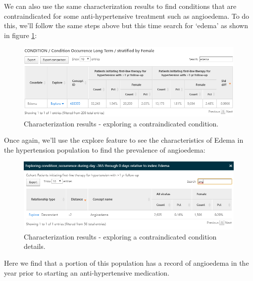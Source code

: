 \documentclass[11pt]{book}
\theoremstyle{definition}
\theoremstyle{definition}
\theoremstyle{definition}
\theoremstyle{remark}
\begin{document}
We can also use the same characterization results to find conditions that are contraindicated for some anti-hypertensive treatment such as angioedema. To do this, we'll follow the same steps above but this time search for `edema' as shown in figure \ref{fig:atlasCharacterizationResultsContra}:

\begin{figure}

{\centering \includegraphics[width=1\linewidth]{images/Characterization/atlasCharacterizationResultsContra} 

}

\caption{Characterization results - exploring a contraindicated condition.}\label{fig:atlasCharacterizationResultsContra}
\end{figure}

Once again, we'll use the explore feature to see the characteristics of Edema in the hypertension population to find the prevalence of angioedema:

\begin{figure}

{\centering \includegraphics[width=1\linewidth]{images/Characterization/atlasCharacterizationResultsContraExplore} 

}

\caption{Characterization results - exploring a contraindicated condition details.}\label{fig:atlasCharacterizationResultsContraExplore}
\end{figure}

Here we find that a portion of this population has a record of angioedema in the year prior to starting an anti-hypertensive medication.
\end{document}
